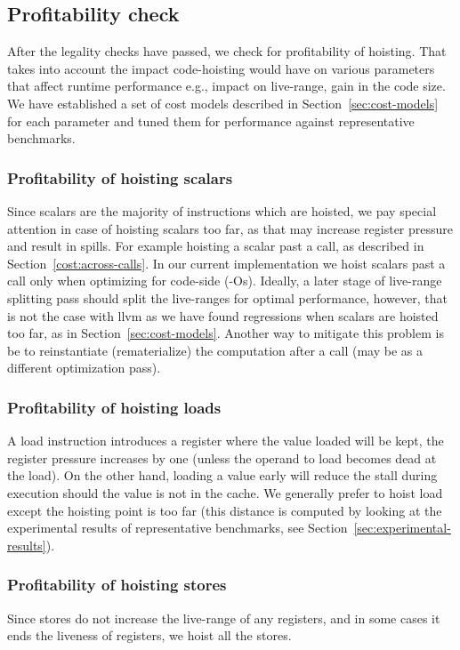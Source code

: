 \documentclass{sig-alternate}
\begin{document}
\subsection{Profitability check}
\label{subsec:profitability}
After the legality checks have passed, we check for profitability of hoisting.
That takes into account the impact code-hoisting would have on various
parameters that affect runtime performance e.g., impact on live-range, gain in
the code size.  We have established a set of cost models described in Section~\ref{sec:cost-models}
for each parameter and tuned them for performance against representative
benchmarks.

\subsubsection{Profitability of hoisting scalars}
Since scalars are the majority of instructions which are hoisted, we pay special
attention in case of hoisting scalars too far, as that may increase register
pressure and result in spills. For example hoisting a scalar past a call, as
described in Section~\ref{cost:across-calls}.  In our current implementation we
hoist scalars past a call only when optimizing for code-side (-Os). Ideally, a
later stage of live-range splitting pass should split the live-ranges for
optimal performance, however, that is not the case with llvm as we have found
regressions when scalars are hoisted too far, as in
Section~\ref{sec:cost-models}. Another way to mitigate this problem is be to
reinstantiate (rematerialize) the computation after a call (may be as a
different optimization pass).

\subsubsection{Profitability of hoisting loads}
A load instruction introduces a register where the value loaded will be kept,
the register pressure increases by one (unless the operand to load becomes dead
at the load). On the other hand, loading a value early will reduce the stall
during execution should the value is not in the cache. We generally prefer to
hoist load except the hoisting point is too far (this distance is computed by
looking at the experimental results of representative benchmarks, see
Section~\ref{sec:experimental-results}).

\subsubsection{Profitability of hoisting stores}
Since stores do not increase the live-range of any registers, and in some cases
it ends the liveness of registers, we hoist all the stores.
\end{document}
